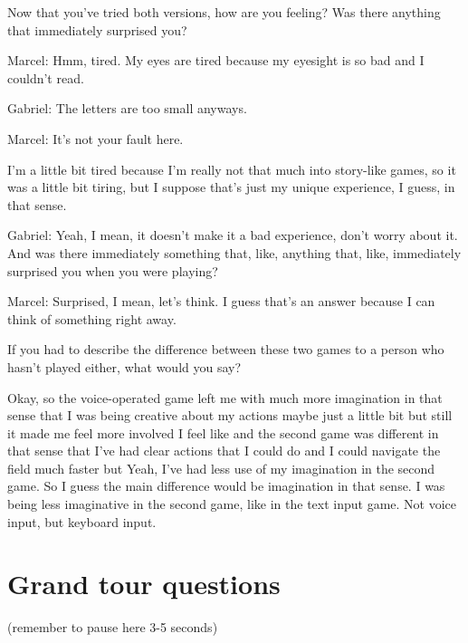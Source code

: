 \begin{QandA}
   \item Now that you’ve tried both versions, how are you feeling? Was there anything that immediately surprised you?
         \begin{answered}
               Marcel: Hmm, tired.
               My eyes are tired because my eyesight is so bad and I couldn't read.


               Gabriel: The letters are too small anyways.


               Marcel: It's not your fault here.


               I'm a little bit tired because I'm really not that much into story-like games, so it was a little bit tiring, but I suppose that's just my unique experience, I guess, in that sense.


               Gabriel: Yeah, I mean, it doesn't make it a bad experience, don't worry about it.
               And was there immediately something that, like, anything that, like, immediately surprised you when you were playing?


               Marcel: Surprised, I mean, let's think.
               I guess that's an answer because I can think of something right away.
            \end{answered}

   \item If you had to describe the difference between these two games to a person who hasn't played either, what would you say?
         \begin{answered}
               Okay, so the voice-operated game
               left me with much more imagination in that sense that I was being creative about my actions maybe just a little bit but still it made me feel more involved I feel like and the second game was different in that sense that
               I've had clear actions that I could do and I could navigate the field much faster but
               Yeah, I've had less use of my imagination in the second game.
               So I guess the main difference would be imagination in that sense.
               I was being less imaginative in the second game, like in the text input game.
               Not voice input, but keyboard input.
         \end{answered}
\end{QandA}




\section{Grand tour questions}
(remember to pause here 3-5 seconds)

